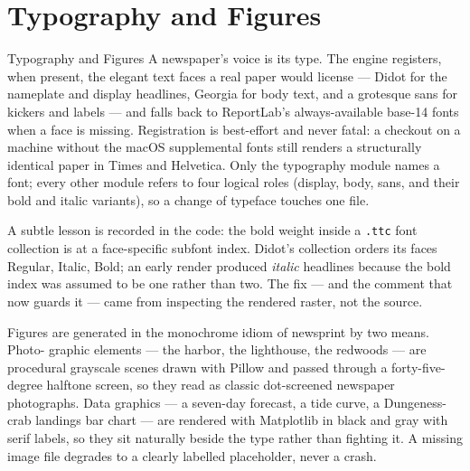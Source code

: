 \documentclass[
  ignorenonframetext,
]{beamer}
\author{\texorpdfstring{}{}}
\date{}
\begin{document}
\section{Typography and Figures}\label{typography-and-figures}

\begin{frame}{Typography and Figures}
A newspaper's voice is its type. The engine registers, when present, the
elegant text faces a real paper would license --- Didot for the
nameplate and display headlines, Georgia for body text, and a grotesque
sans for kickers and labels --- and falls back to ReportLab's
always-available base-14 fonts when a face is missing. Registration is
best-effort and never fatal: a checkout on a machine without the macOS
supplemental fonts still renders a structurally identical paper in Times
and Helvetica. Only the typography module names a font; every other
module refers to four logical roles (display, body, sans, and their bold
and italic variants), so a change of typeface touches one file.

A subtle lesson is recorded in the code: the bold weight inside a
\texttt{.ttc} font collection is at a face-specific subfont index.
Didot's collection orders its faces Regular, Italic, Bold; an early
render produced \emph{italic} headlines because the bold index was
assumed to be one rather than two. The fix --- and the comment that now
guards it --- came from inspecting the rendered raster, not the source.

Figures are generated in the monochrome idiom of newsprint by two means.
Photo- graphic elements --- the harbor, the lighthouse, the redwoods ---
are procedural grayscale scenes drawn with Pillow and passed through a
forty-five-degree halftone screen, so they read as classic dot-screened
newspaper photographs. Data graphics --- a seven-day forecast, a tide
curve, a Dungeness-crab landings bar chart --- are rendered with
Matplotlib in black and gray with serif labels, so they sit naturally
beside the type rather than fighting it. A missing image file degrades
to a clearly labelled placeholder, never a crash.
\end{frame}
\end{document}

